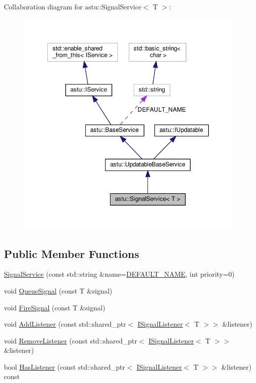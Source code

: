Collaboration diagram for astu\+:\+:Signal\+Service$<$ T $>$\+:\nopagebreak
\begin{figure}[H]
\begin{center}
\leavevmode
\includegraphics[width=347pt]{classastu_1_1SignalService__coll__graph}
\end{center}
\end{figure}
\subsection*{Public Member Functions}
\begin{DoxyCompactItemize}
\item 
\hyperlink{classastu_1_1SignalService_acf4e3bfbacc9eb6654a84d59b3ff1a6a}{Signal\+Service} (const std\+::string \&name=\hyperlink{classastu_1_1BaseService_a9483b26ad631bd14646ef2d2170cd828}{D\+E\+F\+A\+U\+L\+T\+\_\+\+N\+A\+ME}, int priority=0)
\item 
void \hyperlink{classastu_1_1SignalService_aa028a039b066a779af3834ffb3bdaa18}{Queue\+Signal} (const T \&signal)
\item 
void \hyperlink{classastu_1_1SignalService_a3ead09955e8e76bbdd6d9e5a853e88af}{Fire\+Signal} (const T \&signal)
\item 
void \hyperlink{classastu_1_1SignalService_a9027644028616eb9bad00447648cae29}{Add\+Listener} (const std\+::shared\+\_\+ptr$<$ \hyperlink{classastu_1_1ISignalListener}{I\+Signal\+Listener}$<$ T $>$$>$ \&listener)
\item 
void \hyperlink{classastu_1_1SignalService_aea0777f0393a7f3c4dafff9d58934194}{Remove\+Listener} (const std\+::shared\+\_\+ptr$<$ \hyperlink{classastu_1_1ISignalListener}{I\+Signal\+Listener}$<$ T $>$$>$ \&listener)
\item 
bool \hyperlink{classastu_1_1SignalService_acc4935715afef10b89fd905e714be389}{Has\+Listener} (const std\+::shared\+\_\+ptr$<$ \hyperlink{classastu_1_1ISignalListener}{I\+Signal\+Listener}$<$ T $>$$>$ \&listener) const
\end{DoxyCompactItemize}
